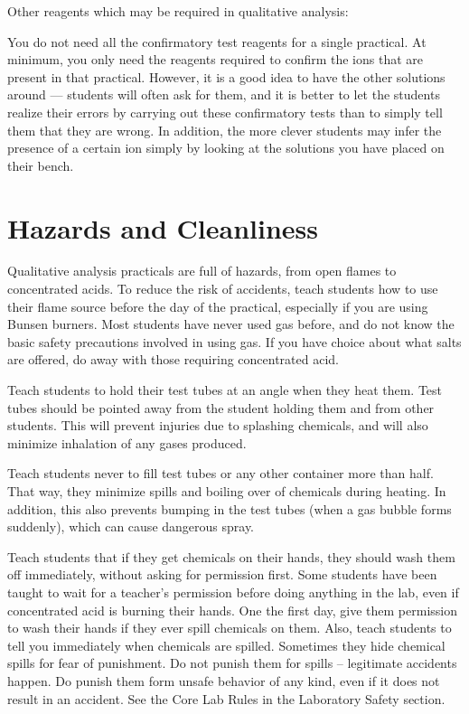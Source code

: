 Other reagents which may be required in qualitative analysis:
You do not need all the confirmatory test reagents for a single practical. 
At minimum, 
you only need the reagents required to confirm the ions 
that are present in that practical. 
However, 
it is a good idea to have the other solutions around — 
students will often ask for them, 
and it is better to let the students realize their errors 
by carrying out these confirmatory tests 
than to simply tell them that they are wrong. 
In addition, 
the more clever students may infer the presence of a certain ion 
simply by looking at the solutions you have placed on their bench.

\section{Hazards and Cleanliness}
Qualitative analysis practicals are full of hazards, 
from open flames to concentrated acids. 
To reduce the risk of accidents, 
teach students how to use their flame source 
before the day of the practical, 
especially if you are using Bunsen burners. 
Most students have never used gas before, 
and do not know the basic safety precautions involved in using gas. 
If you have choice about what salts are offered, 
do away with those requiring concentrated acid.

Teach students to hold their test tubes at an angle when they heat them. 
Test tubes should be pointed away from the student holding them 
and from other students. 
This will prevent injuries due to splashing chemicals, 
and will also minimize inhalation of any gases produced.

Teach students never to fill test tubes 
or any other container more than half. 
That way, 
they minimize spills and boiling over of chemicals during heating. 
In addition, 
this also prevents bumping in the test tubes 
(when a gas bubble forms suddenly), 
which can cause dangerous spray.

Teach students that if they get chemicals on their hands, 
they should wash them off immediately, 
without asking for permission first. 
Some students have been taught to wait for a teacher’s permission 
before doing anything in the lab, 
even if concentrated acid is burning their hands. 
One the first day, 
give them permission to wash their hands 
if they ever spill chemicals on them. 
Also, 
teach students to tell you immediately when chemicals are spilled. 
Sometimes they hide chemical spills for fear of punishment. 
Do not punish them for spills – legitimate accidents happen. 
Do punish them form unsafe behavior of any kind, 
even if it does not result in an accident. 
See the Core Lab Rules in the Laboratory Safety section.

